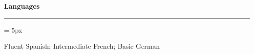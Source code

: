 \documentclass[12pt,letterpaper]{article}
\renewcommand{\labelitemi}{$$}
\newcommand{\sectionhead}[1]{\begin{flushleft}\large\bf{#1}\vspace{.1cm}\hrule\end{flushleft}}
\begin{document}


\sectionhead{Languages}

\begin{list}{\labelitemi}{\leftmargin = 5px}
\item Fluent Spanish; Intermediate French; Basic German
\end{list}

\end{document}

